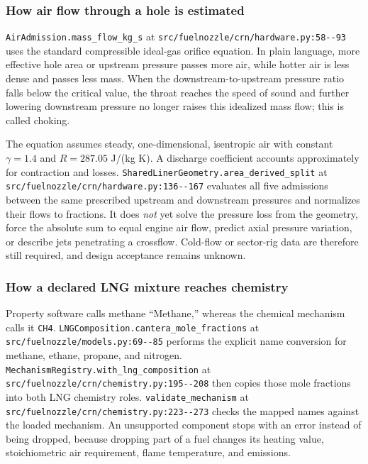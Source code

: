 \documentclass[11pt]{article}
\newcommand{\code}[1]{\nolinkurl{#1}}
\newcommand{\srcline}[2]{\nolinkurl{#1:#2}}
\begin{document}
\subsubsection{How air flow through a hole is estimated}

\code{AirAdmission.mass\_flow\_kg\_s} at
\srcline{src/fuelnozzle/crn/hardware.py}{58--93} uses the standard compressible ideal-gas
orifice equation. In plain language, more effective hole area or upstream pressure passes
more air, while hotter air is less dense and passes less mass. When the downstream-to-upstream
pressure ratio falls below the critical value, the throat reaches the speed of sound and
further lowering downstream pressure no longer raises this idealized mass flow; this is
called choking.

The equation assumes steady, one-dimensional, isentropic air with constant
$\gamma=1.4$ and $R=287.05$ J/(kg K). A discharge coefficient accounts approximately for
contraction and losses. \code{SharedLinerGeometry.area\_derived\_split} at
\srcline{src/fuelnozzle/crn/hardware.py}{136--167} evaluates all five admissions between the
same prescribed upstream and downstream pressures and normalizes their flows to fractions.
It does \emph{not} yet solve the pressure loss from the geometry, force the absolute sum to
equal engine air flow, predict axial pressure variation, or describe jets penetrating a
crossflow. Cold-flow or sector-rig data are therefore still required, and design acceptance
remains unknown.

\subsubsection{How a declared LNG mixture reaches chemistry}

Property software calls methane ``Methane,'' whereas the chemical mechanism calls it
\code{CH4}. \code{LNGComposition.cantera\_mole\_fractions} at
\srcline{src/fuelnozzle/models.py}{69--85} performs the explicit name conversion for methane,
ethane, propane, and nitrogen. \code{MechanismRegistry.with\_lng\_composition} at
\srcline{src/fuelnozzle/crn/chemistry.py}{195--208} then copies those mole fractions into both
LNG chemistry roles. \code{validate\_mechanism} at
\srcline{src/fuelnozzle/crn/chemistry.py}{223--273} checks the mapped names against the loaded
mechanism. An unsupported component stops with an error instead of being dropped, because
dropping part of a fuel changes its heating value, stoichiometric air requirement, flame
temperature, and emissions.
\end{document}
